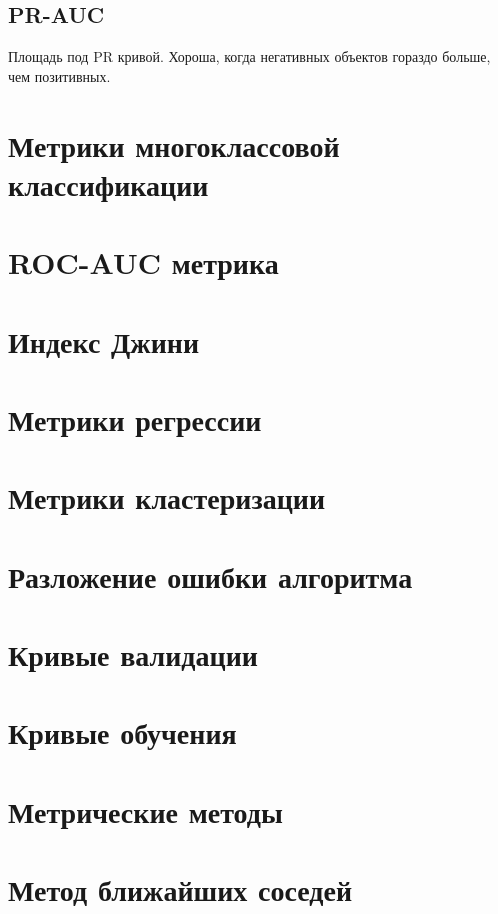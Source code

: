 \subsection{PR-AUC}

Площадь под PR кривой. Хороша, когда негативных объектов гораздо больше, чем позитивных.


\section{Метрики многоклассовой классификации}


\section{ROC-AUC метрика}


\section{Индекс Джини}


\section{Метрики регрессии}


\section{Метрики кластеризации}


\section{Разложение ошибки алгоритма}


\section{Кривые валидации}


\section{Кривые обучения}


\section{Метрические методы}


\section{Метод ближайших соседей}


